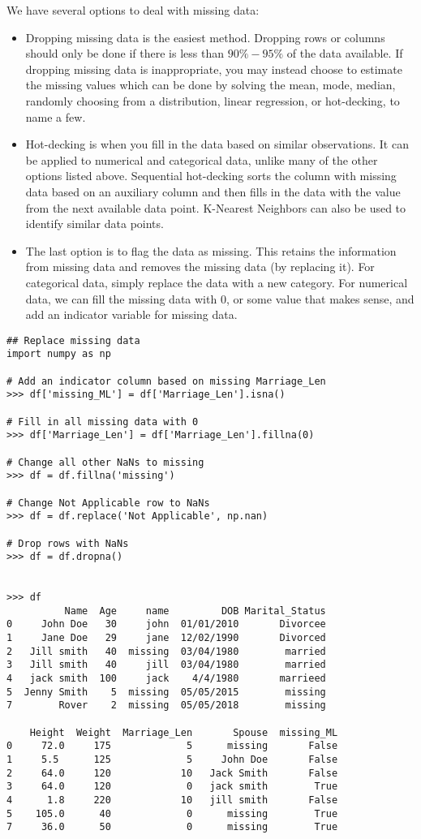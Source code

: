 \noindent We have several options to deal with missing data:
\begin{itemize}
\item Dropping missing data is the easiest method.
Dropping rows or columns should only be done if there is less than $90\%-95\%$ of the data available.
If dropping missing data is inappropriate, you may instead choose to estimate the missing values which can be done by solving the mean, mode, median, randomly choosing from a distribution, linear regression, or hot-decking, to name a few.

\item Hot-decking is when you fill in the data based on similar observations.
It can be applied to numerical and categorical data, unlike many of the other options listed above.
Sequential hot-decking sorts the column with missing data based on an auxiliary column and then fills in the data with the value from the next available data point. K-Nearest Neighbors can also be used to identify similar data points.

\item The last option is to flag the data as missing.
This retains the information from missing data and removes the missing data (by replacing it).
For categorical data, simply replace the data with a new category.
For numerical data, we can fill the missing data with $0$, or some value that makes sense, and add an indicator variable for missing data.
\end{itemize}

\begin{lstlisting}
## Replace missing data
import numpy as np

# Add an indicator column based on missing Marriage_Len
>>> df['missing_ML'] = df['Marriage_Len'].isna()

# Fill in all missing data with 0
>>> df['Marriage_Len'] = df['Marriage_Len'].fillna(0)

# Change all other NaNs to missing
>>> df = df.fillna('missing')

# Change Not Applicable row to NaNs
>>> df = df.replace('Not Applicable', np.nan)

# Drop rows with NaNs
>>> df = df.dropna()


>>> df
          Name  Age     name         DOB Marital_Status
0     John Doe   30     john  01/01/2010       Divorcee
1     Jane Doe   29     jane  12/02/1990       Divorced
2   Jill smith   40  missing  03/04/1980        married
3   Jill smith   40     jill  03/04/1980        married
4   jack smith  100     jack    4/4/1980       marrieed
5  Jenny Smith    5  missing  05/05/2015        missing
7        Rover    2  missing  05/05/2018        missing

    Height  Weight  Marriage_Len       Spouse  missing_ML
0     72.0     175             5      missing       False
1     5.5      125             5     John Doe       False
2     64.0     120            10   Jack Smith       False
3     64.0     120             0   jack smith        True
4      1.8     220            10   jill smith       False
5    105.0      40             0      missing        True
7     36.0      50             0      missing        True
\end{lstlisting}

